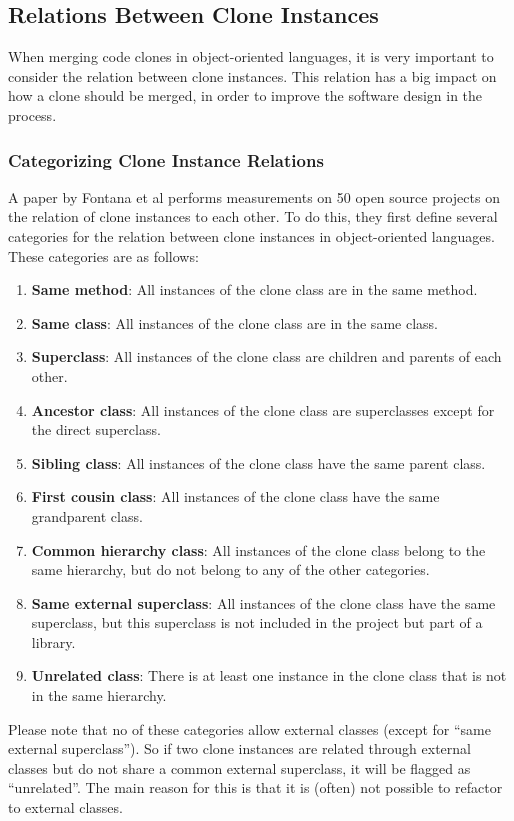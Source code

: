 \documentclass[a4paper]{article}
\begin{document}
\subsection{Relations Between Clone Instances}
When merging code clones in object-oriented languages, it is very important to consider the relation between clone instances. This relation has a big impact on how a clone should be merged, in order to improve the software design in the process.

\subsubsection{Categorizing Clone Instance Relations}
A paper by Fontana et al \cite{fontana2015duplicated} performs measurements on 50 open source projects on the relation of clone instances to each other. To do this, they first define several categories for the relation between clone instances in object-oriented languages. These categories are as follows:
\begin{enumerate}
  \item \textbf{Same method}: All instances of the clone class are in the same method.
  \item \textbf{Same class}: All instances of the clone class are in the same class.
  \item \textbf{Superclass}: All instances of the clone class are children and parents of each other.
  \item \textbf{Ancestor class}: All instances of the clone class are superclasses except for the direct superclass.
  \item \textbf{Sibling class}: All instances of the clone class have the same parent class.
  \item \textbf{First cousin class}: All instances of the clone class have the same grandparent class.
\item \textbf{Common hierarchy class}: All instances of the clone class belong to the same hierarchy, but do not belong to any of the other categories.
\item \textbf{Same external superclass}: All instances of the clone class have the same superclass, but this superclass is not included in the project but part of a library.
\item \textbf{Unrelated class}: There is at least one instance in the clone class that is not in the same hierarchy.
\end{enumerate}
Please note that no of these categories allow external classes (except for ``same external superclass''). So if two clone instances are related through external classes but do not share a common external superclass, it will be flagged as ``unrelated''. The main reason for this is that it is (often) not possible to refactor to external classes.
\end{document}
